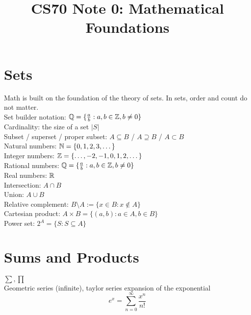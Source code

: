 \documentclass[12pt, letterpaper]{article}
\title{CS70 Note 0: Mathematical Foundations}
\begin{document}
\maketitle

\section{Sets}
Math is built on the foundation of the theory of sets.
In sets, order and count do not matter.
\\Set builder notation:
$\mathbb{Q}=\{\frac{a}{b}:a,b\in\mathbb{Z},b\neq0\}$
\\Cardinality: the size of a set
$|S|$
\\Subset / superset / proper subset:
$A\subseteq B$ / $A\supseteq B$ / $A\subset B$
\\Natural numbers:
$\mathbb{N}=\{0,1,2,3,\dots\}$
\\Integer numbers:
$\mathbb{Z}=\{\dots,-2,-1,0,1,2,\dots\}$
\\Rational numbers:
$\mathbb{Q}=\{\frac{a}{b}:a,b\in\mathbb{Z},b\neq0\}$
\\Real numbers:
$\mathbb{R}$
\\Intersection: 
$A\cap B$
\\Union: 
$A\cup B$
\\Relative complement:
$B\setminus A:=\{x\in B:x\notin A\}$
\\Cartesian product:
$A\times B=\{(a,b):a\in A,b\in B\}$
\\Power set:
$2^A=\{S:S\subseteq A\}$
\section{Sums and Products}
$\sum,\prod$
\\Geometric series (infinite), taylor series expansion of the exponential
$$e^x=\sum_{n=0}^\infty\frac{x^n}{n!}$$
\end{document}
